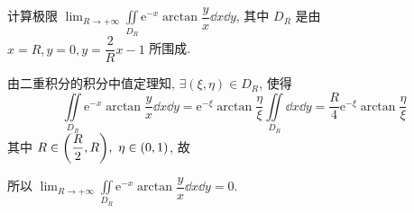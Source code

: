 \begin{example}
    计算极限 $\displaystyle\lim_{R\to+\infty}\iint\limits_{D_R}\mathrm{e}^{-x}\arctan\dfrac{y}{x}\dd x\dd y$, 其中 $D_R$ 是由 $x=R,y=0,y=\dfrac{2}{R}x-1$ 所围成.
\end{example}
\begin{solution}
    由二重积分的积分中值定理知, $\exists(\xi,\eta)\in D_R$, 
    使得 $$\iint\limits_{D_R}\mathrm{e}^{-x}\arctan\dfrac{y}{x}\dd x\dd y=\mathrm{e}^{-\xi}\arctan\dfrac{\eta}{\xi}\iint\limits_{D_R}\dd x\dd y=\dfrac{R}{4}\mathrm{e}^{-\xi}\arctan\dfrac{\eta}{\xi}$$
    其中 $R\in\qty(\dfrac{R}{2},R),~\eta\in(0,1)$, 故 
    所以 $\displaystyle\lim_{R\to+\infty}\iint\limits_{D_R}\mathrm{e}^{-x}\arctan\dfrac{y}{x}\dd x\dd y=0.$
\end{solution}

